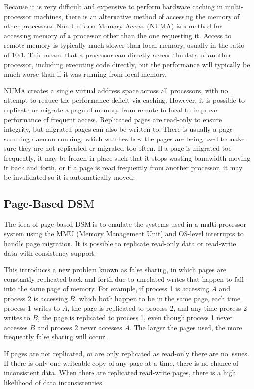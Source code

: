 Because it is very difficult and expensive to perform hardware caching in multi-processor machines, there is an alternative method of accessing the memory of other processors. Non-Uniform Memory Access (NUMA) is a method for accessing memory of a processor other than the one requesting it. Access to remote memory is typically much slower than local memory, usually in the ratio of 10:1. This means that a processor can directly access the data of another processor, including executing code directly, but the performance will typically be much worse than if it was running from local memory.

NUMA creates a single virtual address space across all processors, with no attempt to reduce the performance deficit via caching. However, it is possible to replicate or migrate a page of memory from remote to local to improve performance of frequent access. Replicated pages are read-only to ensure integrity, but migrated pages can also be written to. There is usually a page scanning daemon running, which watches how the pages are being used to make sure they are not replicated or migrated too often. If a page is migrated too frequently, it may be frozen in place such that it stops wasting bandwidth moving it back and forth, or if a page is read frequently from another processor, it may be invalidated so it is automatically moved.

\subsection*{Page-Based DSM}

The idea of page-based DSM is to emulate the systems used in a multi-processor system using the MMU (Memory Management Unit) and OS-level interrupts to handle page migration. It is possible to replicate read-only data or read-write data with consistency support.

This introduces a new problem known as false sharing, in which pages are constantly replicated back and forth due to unrelated writes that happen to fall into the same page of memory. For example, if process 1 is accessing $A$ and process 2 is accessing $B$, which both happen to be in the same page, each time process 1 writes to $A$, the page is replicated to process 2, and any time process 2 writes to $B$, the page is replicated to process 1, even though process 1 never accesses $B$ and process 2 never accesses $A$. The larger the pages used, the more frequently false sharing will occur.

If pages are not replicated, or are only replicated as read-only there are no issues. If there is only one writeable copy of any page at a time, there is no chance of inconsistent data. When there are replicated read-write pages, there is a high likelihood of data inconsistencies.